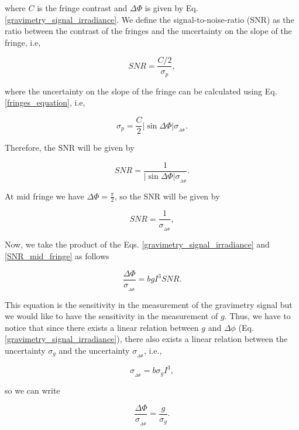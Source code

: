 \documentclass{article}
\begin{document}
where $C$ is the fringe contrast and $\Delta \Phi$ is given by Eq. \ref{gravimetry_signal_irradiance}. We define the signal-to-noise-ratio (SNR) as the ratio between the contrast of the fringes and the uncertainty on the slope of the fringe, i.e,

\begin{equation}
    SNR = \frac{C/2}{\sigma_{p}}, 
\end{equation}

where the uncertainty on the slope of the fringe can be calculated using Eq. \ref{fringes_equation}, i.e,

\begin{equation}
    \sigma_{p} = \frac{C}{2} |\sin{\Delta \Phi}| \sigma_{_{\Delta \Phi}}.
\end{equation}

Therefore, the SNR will be given by

\begin{equation}
    SNR = \frac{1}{|\sin{\Delta \Phi}|  \sigma_{_{\Delta \Phi}}}.
\end{equation}

At mid fringe we have $\Delta \Phi = \frac{\pi}{2}$, so the SNR will be given by

\begin{equation}\label{SNR_mid_fringe}
    SNR = \frac{1}{\sigma_{_{\Delta \Phi}}},
\end{equation}

Now, we take the product of the Eqs. \ref{gravimetry_signal_irradiance} and \ref{SNR_mid_fringe} as follows

\begin{equation}\label{sensitivity_in_phase}
    \frac{\Delta \Phi}{\sigma_{_{\Delta \Phi}}} = b g I^3 SNR.
\end{equation}

This equation is the sensitivity in the measurement of the gravimetry signal but we would like to have the sensitivity in the measurement of $g$. Thus,
we have to notice that since there exists a linear relation between $g$ and $\Delta \phi$ (Eq. \ref{gravimetry_signal_irradiance}), there also exists a linear relation between the uncertainty $\sigma_{g}$ and the uncertainty $\sigma_{_{\Delta \Phi}}$, i.e.,

\begin{equation}
    \sigma_{_{\Delta \Phi}} = b \sigma_{g} I^3,
\end{equation}

so we can write 

\begin{equation}
    \frac{\Delta \Phi}{\sigma_{_{\Delta \Phi}}} = \frac{g}{\sigma_{g}}.
\end{equation}
\end{document}
